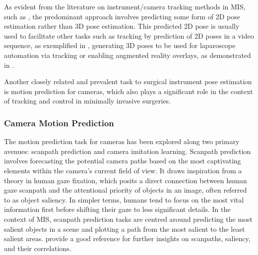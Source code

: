 As evident from the literature on instrument/camera tracking methods in MIS, such as \citep{art_net,multi_semi_pose,concurrent_segmentation_iro_laina,li2021data}, the predominant approach involves predicting some form of 2D pose estimation rather than 3D pose estimation. This predicted 2D pose is usually used to facilitate other tasks such as tracking by prediction of 2D poses in a video sequence, as exemplified in \citet{concurrent_segmentation_iro_laina}, generating 3D poses to be used for laparoscope automation via tracking \citep{li2021data} or enabling augmented reality overlays, as demonstrated in \citet{art_net}.

Another closely related and prevalent task to surgical instrument pose estimation is motion prediction for cameras, which also plays a significant role in the context of tracking and control in minimally invasive surgeries.

\subsubsection{Camera Motion Prediction}
The motion prediction task for cameras has been explored along two primary avenues: scanpath prediction and camera imitation learning.
Scanpath prediction involves forecasting the potential camera paths based on the most captivating elements within the camera's current field of view. It draws inspiration from a theory in human gaze fixation, which posits a direct connection between human gaze scanpath and the attentional priority of objects in an image, often referred to as object saliency. In simpler terms, humans tend to focus on the most vital information first before shifting their gaze to less significant details. In the context of MIS, scanpath prediction tasks are centred around predicting the most salient objects in a scene and plotting a path from the most salient to the least salient areas.
\citet{Foulsham} provide a good reference for further insights on scanpaths, saliency, and their correlations.


